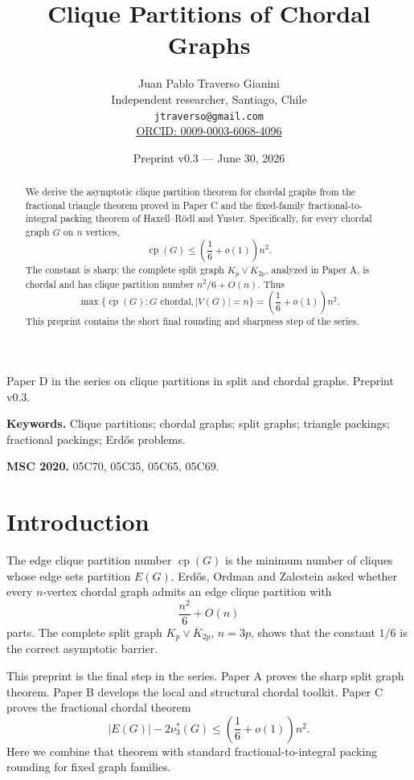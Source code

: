 \documentclass[11pt]{article}
\title{Clique Partitions of Chordal Graphs}
\author{
Juan Pablo Traverso Gianini\\
Independent researcher, Santiago, Chile\\
\texttt{jtraverso@gmail.com}\\
\href{https://orcid.org/0009-0003-6068-4096}{ORCID: 0009-0003-6068-4096}
}
\date{Preprint v0.3 --- June 30, 2026}
\theoremstyle{definition}
\newcommand{\cp}{\operatorname{cp}}
\begin{document}
\maketitle

\begin{center}
{\small Paper D in the series on clique partitions in split and chordal graphs. Preprint v0.3.}
\end{center}

\noindent\textbf{Keywords.}
Clique partitions; chordal graphs; split graphs; triangle packings; fractional packings; Erdős problems.

\medskip

\noindent\textbf{MSC 2020.}
05C70, 05C35, 05C65, 05C69.

\begin{abstract}
We derive the asymptotic clique partition theorem for chordal graphs from the fractional triangle theorem proved in Paper C and the fixed-family fractional-to-integral packing theorem of Haxell--Rödl and Yuster. Specifically, for every chordal graph \(G\) on \(n\) vertices,
\[
    \cp(G)\le
    \left(\frac16+o(1)\right)n^2.
\]
The constant is sharp: the complete split graph \(K_p\vee\overline{K}_{2p}\), analyzed in Paper A, is chordal and has clique partition number \(n^2/6+O(n)\). Thus
\[
    \max\{\cp(G):G\text{ chordal}, |V(G)|=n\}
    =
    \left(\frac16+o(1)\right)n^2.
\]
This preprint contains the short final rounding and sharpness step of the series.
\end{abstract}

\tableofcontents

\section{Introduction}

The edge clique partition number \(\cp(G)\) is the minimum number of cliques whose edge sets partition \(E(G)\). Erdős, Ordman and Zalcstein asked whether every \(n\)-vertex chordal graph admits an edge clique partition with
\[
    \frac{n^2}{6}+O(n)
\]
parts. The complete split graph \(K_p\vee\overline{K}_{2p}\), \(n=3p\), shows that the constant \(1/6\) is the correct asymptotic barrier.

This preprint is the final step in the series. Paper A proves the sharp split graph theorem. Paper B develops the local and structural chordal toolkit. Paper C proves the fractional chordal theorem
\[
    |E(G)|-2\nu_3^*(G)
    \le
    \left(\frac16+o(1)\right)n^2.
\]
Here we combine that theorem with standard fractional-to-integral packing rounding for fixed graph families.
\end{document}
